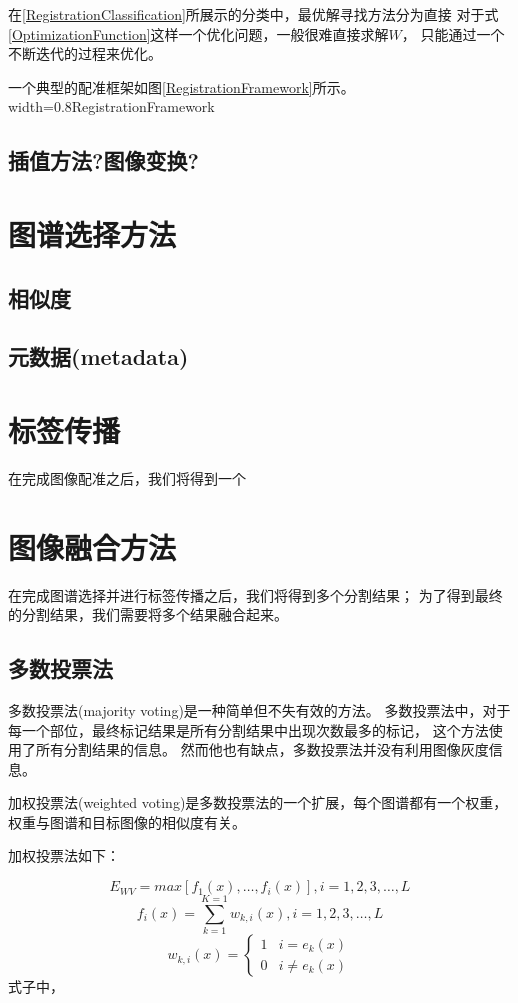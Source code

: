在\ref{RegistrationClassification}所展示的分类中，最优解寻找方法分为直接
对于式\ref{OptimizationFunction}这样一个优化问题，一般很难直接求解$W$，
只能通过一个不断迭代的过程来优化。

一个典型的配准框架如图\ref{RegistrationFramework}所示。
%
{width=0.8\textwidth}{RegistrationFramework}

\subsection{插值方法?图像变换?}\label{SectionModality}

\section{图谱选择方法}

\subsection{相似度}
\subsection{元数据(metadata)}

\section{标签传播}
在完成图像配准之后，我们将得到一个

\section{图像融合方法}
在完成图谱选择并进行标签传播之后，我们将得到多个分割结果；
为了得到最终的分割结果，我们需要将多个结果融合起来。

\subsection{多数投票法}
多数投票法(majority voting)是一种简单但不失有效的方法。
多数投票法中，对于每一个部位，最终标记结果是所有分割结果中出现次数最多的标记，
这个方法使用了所有分割结果的信息。
然而他也有缺点，多数投票法并没有利用图像灰度信息。

加权投票法(weighted voting)是多数投票法的一个扩展，每个图谱都有一个权重，
权重与图谱和目标图像的相似度有关。

加权投票法如下：

\begin{equation}
  E_{WV}=max[f_1(x),\ldots,f_i(x)], i=1,2,3,\ldots,L
\end{equation}
\begin{equation}
  f_i(x)=\sum_{k=1}^{K=1}w_{k,i}(x), i=1,2,3,\ldots,L
\end{equation}
\begin{equation}
  w_{k,i}(x)=
  \begin{cases}
    1 & i=e_k(x)\\
    0 & i\ne e_k(x)
  \end{cases}
\end{equation}
式子中，

